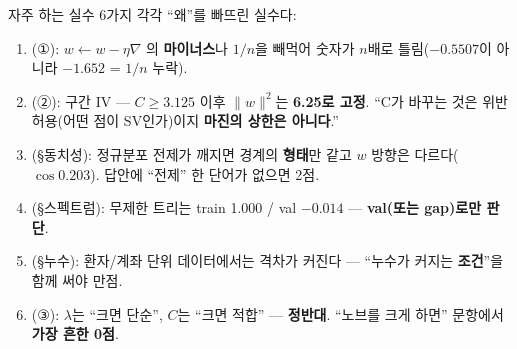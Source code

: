 \documentclass[aspectratio=169,11pt]{beamer}
\begin{document}
\begin{frame}{자주 하는 실수 6가지}
  각각 ``왜''를 빠뜨린 실수다:
  \begin{enumerate}
    \item {}(①): $w\leftarrow w-\eta\nabla$
      의 \textbf{마이너스}나 $1/n$을 빼먹어 숫자가 $n$배로
      틀림($-0.5507$이 아니라 $-1.652$ = $1/n$ 누락).
    \item {}(②): 구간 IV
      --- $C\ge3.125$ 이후 $\|w\|^2$는 \textbf{6.25로 고정}.
      ``C가 바꾸는 것은 위반 허용(어떤 점이 SV인가)이지
      \textbf{마진의 상한은 아니다}.''
    \item {}(§동치성):
      정규분포 전제가 깨지면 경계의 \textbf{형태}만 같고 $w$
      방향은 다르다($\cos 0.203$). 답안에 ``전제'' 한 단어가
      없으면 2점.
    \item {}(§스펙트럼):
      무제한 트리는 train 1.000 / val $-0.014$ ---
      \textbf{val(또는 gap)로만 판단}.
    \item {}(§누수): 환자/계좌 단위
      데이터에서는 격차가 커진다 --- ``누수가 커지는
      \textbf{조건}''을 함께 써야 만점.
    \item {}(③): $\lambda$는 ``크면 단순'', $C$는 ``크면 적합''
      --- \textbf{정반대}. ``노브를 크게 하면'' 문항에서
      \textbf{가장 흔한 0점}.
  \end{enumerate}
\end{frame}
\end{document}
